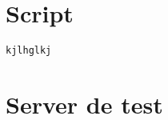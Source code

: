 \appendix

\section{Script}

\begin{lstlisting}
kjlhglkj

\end{lstlisting}
\section{Server de test}

